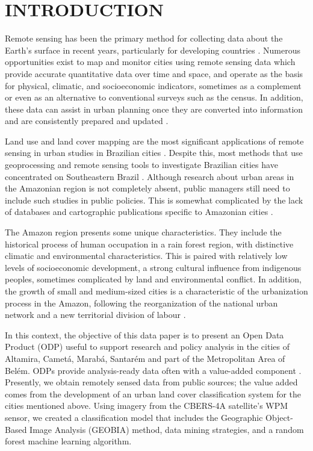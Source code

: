 \documentclass[preprint, 3p,
authoryear]{elsarticle} %
\begin{document}
\hypertarget{introduction}{%
\section{INTRODUCTION}\label{introduction}}

Remote sensing has been the primary method for collecting data about the
Earth's surface in recent years, particularly for developing countries
\citep{Zhu2022}. Numerous opportunities exist to map and monitor cities
using remote sensing data which provide accurate quantitative data over
time and space, and operate as the basis for physical, climatic, and
socioeconomic indicators, sometimes as a complement or even as an
alternative to conventional surveys such as the census. In addition,
these data can assist in urban planning once they are converted into
information and are consistently prepared and updated \citep{Weng2018}.

Land use and land cover mapping are the most significant applications of
remote sensing in urban studies in Brazilian cities \citep{Almeida2010}.
Despite this, most methods that use geoprocessing and remote sensing
tools to investigate Brazilian cities have concentrated on Southeastern
Brazil \citep{Santos2022}. Although research about urban areas in the
Amazonian region is not completely absent, public managers still need to
include such studies in public policies. This is somewhat complicated by
the lack of databases and cartographic publications specific to
Amazonian cities \citep{Cardoso2020}.

The Amazon region presents some unique characteristics. They include the
historical process of human occupation in a rain forest region, with
distinctive climatic and environmental characteristics. This is paired
with relatively low levels of socioeconomic development, a strong
cultural influence from indigenous peoples, sometimes complicated by
land and environmental conflict. In addition, the growth of small and
medium-sized cities is a characteristic of the urbanization process in
the Amazon, following the reorganization of the national urban network
and a new territorial division of labour
\citep{Trindade1998, Trindade2011}.

In this context, the objective of this data paper is to present an Open
Data Product (ODP) useful to support research and policy analysis in the
cities of Altamira, Cametá, Marabá, Santarém and part of the
Metropolitan Area of Belém. ODPs provide analysis-ready data often with
a value-added component \citep[see][]{arribas2021open}. Presently, we
obtain remotely sensed data from public sources; the value added comes
from the development of an urban land cover classification system for
the cities mentioned above. Using imagery from the CBERS-4A satellite's
WPM sensor, we created a classification model that includes the
Geographic Object-Based Image Analysis (GEOBIA) method, data mining
strategies, and a random forest machine learning algorithm.
\end{document}
